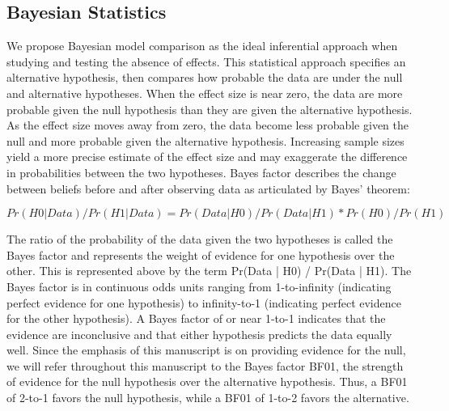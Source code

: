 \documentclass{article}
\begin{document}
\subsection{Bayesian Statistics }
We propose Bayesian model comparison as the ideal inferential approach when studying and testing the absence of effects. This statistical approach specifies an alternative hypothesis, then compares how probable the data are under the null and alternative hypotheses. When the effect size is near zero, the data are more probable given the null hypothesis than they are given the alternative hypothesis. As the effect size moves away from zero, the data become less probable given the null and more probable given the alternative hypothesis.  Increasing sample sizes yield a more precise estimate of the effect size and may exaggerate the difference in probabilities between the two hypotheses. Bayes factor describes the change between beliefs before and after observing data as articulated by Bayes’ theorem:

\begin{equation}
Pr(H0 | Data) / Pr(H1 | Data) = Pr(Data | H0) / Pr(Data | H1) * Pr(H0) / Pr (H1) 
\end{equation}

The ratio of the probability of the data given the two hypotheses is called the Bayes factor and represents the weight of evidence for one hypothesis over the other. This is represented above by the term %
Pr(Data | H0) / Pr(Data | H1). The Bayes factor is in continuous odds units ranging from 1-to-infinity (indicating perfect evidence for one hypothesis) to infinity-to-1 (indicating perfect evidence for the other hypothesis). A Bayes factor of or near 1-to-1 indicates that the evidence are inconclusive and that either hypothesis predicts the data equally well. Since the emphasis of this manuscript is on providing evidence for the null, we will refer throughout this manuscript to the Bayes factor BF01, the strength of evidence for the null hypothesis over the alternative hypothesis. Thus, a BF01 of 2-to-1 favors the null hypothesis, while a BF01 of 1-to-2 favors the alternative.
\end{document}
